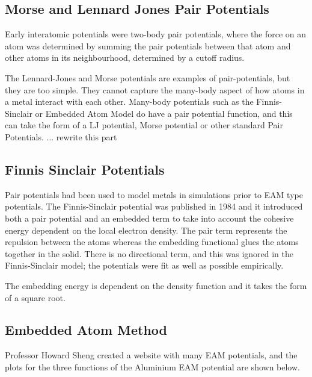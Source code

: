 
\subsection{Morse and Lennard Jones Pair Potentials}

Early interatomic potentials were two-body pair potentials, where the force on an atom was determined by summing the pair potentials between that atom and other atoms in its neighbourhood, determined by a cutoff radius.

The Lennard-Jones and Morse potentials are examples of pair-potentials, but they are too simple.  They cannot capture the many-body aspect of how atoms in a metal interact with each other.  Many-body potentials such as the Finnis-Sinclair or Embedded Atom Model do have a pair potential function, and this can take the form of a LJ potential, Morse potential or other standard Pair Potentials. ... rewrite this part

\subsection{Finnis Sinclair Potentials}

Pair potentials had been used to model metals in simulations prior to EAM type potentials.  The Finnis-Sinclair potential was published in 1984 and it introduced both a pair potential and an embedded term to take into account the cohesive energy dependent on the local electron density.  The pair term represents the repulsion between the atoms whereas the embedding functional glues the atoms together in the solid.  There is no directional term, and this was ignored in the Finnis-Sinclair model; the potentials were fit as well as possible empirically.  

The embedding energy is dependent on the density function and it takes the form of a square root.



\subsection{Embedded Atom Method}


\eqEAM

Professor Howard Sheng created a website with many EAM potentials, and the plots for the three functions of the Aluminium EAM potential are shown below.

